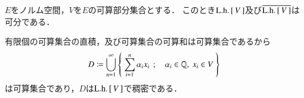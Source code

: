 	\begin{screen}
		\begin{lem}[可算集合の線型包は可分]
			$E$をノルム空間，$V$を$E$の可算部分集合とする．
			このとき$\mathrm{L.h.}\left[\, V\, \right]$及び$\overline{\mathrm{L.h.}\left[\, V\, \right]}$は可分である．
		\end{lem}
	\end{screen}
	
	\begin{prf}
		有限個の可算集合の直積，及び可算集合の可算和は可算集合であるから
		\begin{align}
			D \coloneqq \bigcup_{n=1}^\infty 
			\left\{\ \sum_{i=1}^n \alpha_i x_i\ \, ; \quad \alpha_i \in \mathbb{Q},\ x_i \in V\ \right\}
		\end{align}
		は可算集合であり，$D$は$\mathrm{L.h.}\left[\, V\, \right]$で稠密である．
		\QED
	\end{prf}